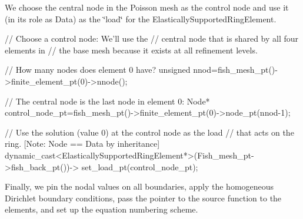 We choose the central node in the Poisson mesh as the control node and use it (in its role as {\ttfamily Data}) as the \char`\"{}load\char`\"{} for the {\ttfamily Elastically\+Supported\+Ring\+Element}.


\begin{DoxyCodeInclude}
 \textcolor{comment}{// Choose a control node: We'll use the}
 \textcolor{comment}{// central node that is shared by all four elements in}
 \textcolor{comment}{// the base mesh because it exists at all refinement levels.}
 
 \textcolor{comment}{// How many nodes does element 0 have?}
 \textcolor{keywordtype}{unsigned} nnod=fish\_mesh\_pt()->finite\_element\_pt(0)->nnode();

 \textcolor{comment}{// The central node is the last node in element 0:}
 Node* control\_node\_pt=fish\_mesh\_pt()->finite\_element\_pt(0)->node\_pt(nnod-1);
 
 \textcolor{comment}{// Use the solution (value 0) at the control node as the load}
 \textcolor{comment}{// that acts on the ring. [Note: Node == Data by inheritance]}
 \textcolor{keyword}{dynamic\_cast<}ElasticallySupportedRingElement*\textcolor{keyword}{>}(Fish\_mesh\_pt->fish\_back\_pt())->
  set\_load\_pt(control\_node\_pt);

\end{DoxyCodeInclude}


Finally, we pin the nodal values on all boundaries, apply the homogeneous Dirichlet boundary conditions, pass the pointer to the source function to the elements, and set up the equation numbering scheme.


